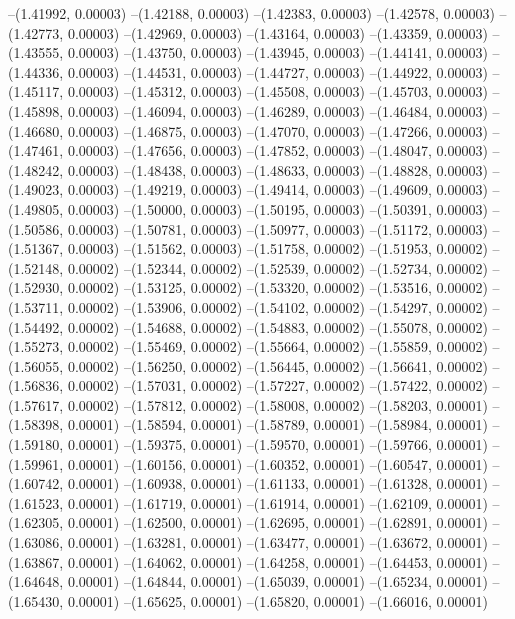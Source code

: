 --(1.41992, 0.00003)
--(1.42188, 0.00003)
--(1.42383, 0.00003)
--(1.42578, 0.00003)
--(1.42773, 0.00003)
--(1.42969, 0.00003)
--(1.43164, 0.00003)
--(1.43359, 0.00003)
--(1.43555, 0.00003)
--(1.43750, 0.00003)
--(1.43945, 0.00003)
--(1.44141, 0.00003)
--(1.44336, 0.00003)
--(1.44531, 0.00003)
--(1.44727, 0.00003)
--(1.44922, 0.00003)
--(1.45117, 0.00003)
--(1.45312, 0.00003)
--(1.45508, 0.00003)
--(1.45703, 0.00003)
--(1.45898, 0.00003)
--(1.46094, 0.00003)
--(1.46289, 0.00003)
--(1.46484, 0.00003)
--(1.46680, 0.00003)
--(1.46875, 0.00003)
--(1.47070, 0.00003)
--(1.47266, 0.00003)
--(1.47461, 0.00003)
--(1.47656, 0.00003)
--(1.47852, 0.00003)
--(1.48047, 0.00003)
--(1.48242, 0.00003)
--(1.48438, 0.00003)
--(1.48633, 0.00003)
--(1.48828, 0.00003)
--(1.49023, 0.00003)
--(1.49219, 0.00003)
--(1.49414, 0.00003)
--(1.49609, 0.00003)
--(1.49805, 0.00003)
--(1.50000, 0.00003)
--(1.50195, 0.00003)
--(1.50391, 0.00003)
--(1.50586, 0.00003)
--(1.50781, 0.00003)
--(1.50977, 0.00003)
--(1.51172, 0.00003)
--(1.51367, 0.00003)
--(1.51562, 0.00003)
--(1.51758, 0.00002)
--(1.51953, 0.00002)
--(1.52148, 0.00002)
--(1.52344, 0.00002)
--(1.52539, 0.00002)
--(1.52734, 0.00002)
--(1.52930, 0.00002)
--(1.53125, 0.00002)
--(1.53320, 0.00002)
--(1.53516, 0.00002)
--(1.53711, 0.00002)
--(1.53906, 0.00002)
--(1.54102, 0.00002)
--(1.54297, 0.00002)
--(1.54492, 0.00002)
--(1.54688, 0.00002)
--(1.54883, 0.00002)
--(1.55078, 0.00002)
--(1.55273, 0.00002)
--(1.55469, 0.00002)
--(1.55664, 0.00002)
--(1.55859, 0.00002)
--(1.56055, 0.00002)
--(1.56250, 0.00002)
--(1.56445, 0.00002)
--(1.56641, 0.00002)
--(1.56836, 0.00002)
--(1.57031, 0.00002)
--(1.57227, 0.00002)
--(1.57422, 0.00002)
--(1.57617, 0.00002)
--(1.57812, 0.00002)
--(1.58008, 0.00002)
--(1.58203, 0.00001)
--(1.58398, 0.00001)
--(1.58594, 0.00001)
--(1.58789, 0.00001)
--(1.58984, 0.00001)
--(1.59180, 0.00001)
--(1.59375, 0.00001)
--(1.59570, 0.00001)
--(1.59766, 0.00001)
--(1.59961, 0.00001)
--(1.60156, 0.00001)
--(1.60352, 0.00001)
--(1.60547, 0.00001)
--(1.60742, 0.00001)
--(1.60938, 0.00001)
--(1.61133, 0.00001)
--(1.61328, 0.00001)
--(1.61523, 0.00001)
--(1.61719, 0.00001)
--(1.61914, 0.00001)
--(1.62109, 0.00001)
--(1.62305, 0.00001)
--(1.62500, 0.00001)
--(1.62695, 0.00001)
--(1.62891, 0.00001)
--(1.63086, 0.00001)
--(1.63281, 0.00001)
--(1.63477, 0.00001)
--(1.63672, 0.00001)
--(1.63867, 0.00001)
--(1.64062, 0.00001)
--(1.64258, 0.00001)
--(1.64453, 0.00001)
--(1.64648, 0.00001)
--(1.64844, 0.00001)
--(1.65039, 0.00001)
--(1.65234, 0.00001)
--(1.65430, 0.00001)
--(1.65625, 0.00001)
--(1.65820, 0.00001)
--(1.66016, 0.00001)
